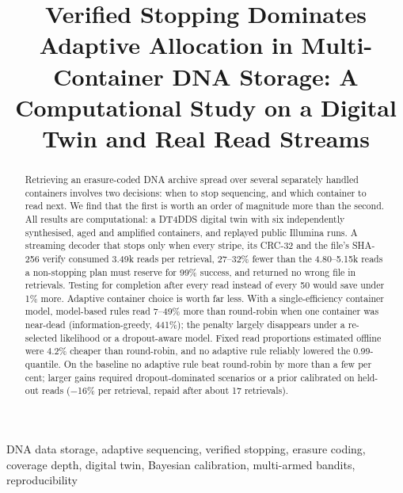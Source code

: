 \documentclass[conference,onecolumn,11pt]{IEEEtran}
\begin{document}
\title{Verified Stopping Dominates Adaptive Allocation in Multi-Container DNA Storage: A Computational Study on a Digital Twin and Real Read Streams}

\author{
\and
{}
\and
{}
}

\maketitle

\begin{abstract}
Retrieving an erasure-coded DNA archive spread over several separately handled containers involves two
decisions: when to stop sequencing, and which container to read next.  We find that the first is worth an
order of magnitude more than the second.  All results are computational: a DT4DDS digital twin with six
independently synthesised, aged and amplified containers, and replayed public Illumina runs.  A streaming
decoder that stops only when every stripe, its CRC-32 and the file's SHA-256 verify consumed 3.49k reads
per retrieval, 27--32\% fewer than the 4.80--5.15k reads a non-stopping plan must reserve for 99\%
success, and returned no wrong file in \SafeN{} retrievals.  Testing for completion after every read
instead of every 50 would save under 1\% more.  Adaptive container choice is worth far less.  With a
single-efficiency container model, model-based rules read 7--49\% more than round-robin when one
container was near-dead (information-greedy, 441\%); the penalty largely disappears under a re-selected
likelihood or a dropout-aware model.  Fixed read proportions estimated offline were 4.2\% cheaper than
round-robin, and no adaptive rule reliably lowered the 0.99-quantile.  On the baseline no adaptive rule
beat round-robin by more than a few per cent; larger gains required dropout-dominated scenarios or a
prior calibrated on held-out reads ($-$16\% per retrieval, repaid after about 17 retrievals).
\end{abstract}

\begin{IEEEkeywords}
DNA data storage, adaptive sequencing, verified stopping, erasure coding, coverage depth, digital twin, Bayesian calibration, multi-armed bandits, reproducibility
\end{IEEEkeywords}
\end{document}
